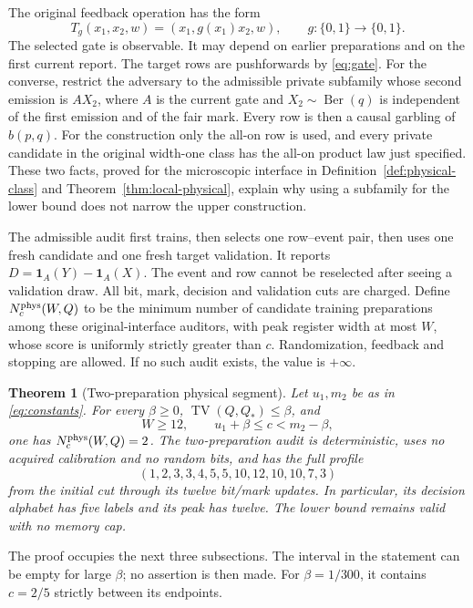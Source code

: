\documentclass[11pt]{amsart}
\newtheorem{theorem}{Theorem}[section]
\theoremstyle{definition}\newtheorem{definition}[theorem]{Definition}
\theoremstyle{remark}\newtheorem{remark}[theorem]{Remark}
\newcommand{\TV}{\operatorname{TV}}
\newcommand{\Ber}{\operatorname{Ber}}
\newcommand{\1}{\mathbf 1}
\newcommand{\Qstar}{Q_*}
\begin{document}
The original feedback operation has the form
\begin{equation}\label{eq:gate}
 T_g(x_1,x_2,w)=(x_1,g(x_1)x_2,w),
 \qquad g:\{0,1\}\longrightarrow\{0,1\}.
\end{equation}
The selected gate is observable. It may depend on earlier preparations
and on the first current report. The target rows are pushforwards by
\eqref{eq:gate}. For the converse, restrict the adversary to the admissible
private subfamily whose second emission is $A X_2$, where $A$ is the
current gate and $X_2\sim\Ber(q)$ is independent of the first emission
and of the fair mark. Every row is then a causal garbling of $b(p,q)$.
For the construction only the all-on row is used, and every private
candidate in the original width-one class has the all-on product law
just specified. These two facts, proved for the microscopic interface in
Definition~\ref{def:physical-class} and Theorem~\ref{thm:local-physical}, explain
why using a subfamily for the lower bound does not narrow the upper
construction.

The admissible audit first trains, then selects one row--event pair, then
uses one fresh candidate and one fresh target validation. It reports
$D=\1_A(Y)-\1_A(X)$. The event and row cannot be reselected after
seeing a validation draw. All bit, mark, decision and validation cuts are
charged. Define $N_c^{\rm phys}(W,Q)$ to be the minimum number of candidate
training preparations among these original-interface auditors, with peak
register width at most $W$, whose score is uniformly strictly greater
than $c$. Randomization, feedback and stopping are allowed. If no such
audit exists, the value is $+\infty$.

\begin{theorem}[Two-preparation physical segment]\label{thm:physical}
Let $u_1,m_2$ be as in \eqref{eq:constants}. For every $\beta\ge0$,
$\TV(Q,\Qstar)\le\beta$, and
\[
       W\ge12,\qquad u_1+\beta\le c<m_2-\beta,
\]
one has $N_c^{\rm phys}(W,Q)=2$. The two-preparation audit is deterministic,
uses no acquired calibration and no random bits, and has the full profile
\begin{equation}\label{eq:profile}
 (1,2,3,3,4,5,5,10,12,10,10,7,3)
\end{equation}
from the initial cut through its twelve bit/mark updates. In particular,
its decision alphabet has five labels and its peak has twelve. The lower
bound remains valid with no memory cap.
\end{theorem}
The proof occupies the next three subsections. The interval in the
statement can be empty for large $\beta$; no assertion is then made.
For $\beta=1/300$, it contains $c=2/5$ strictly between its endpoints.
\end{document}
